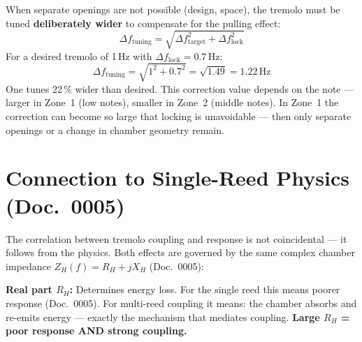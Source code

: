 \documentclass[11pt,a4paper]{article}
\begin{document}
When separate openings are not possible (design, space), the tremolo must be tuned \textbf{deliberately wider} to compensate for the pulling effect:
\begin{equation}
\Delta f_\text{tuning} = \sqrt{\Delta f_\text{target}^2 + \Delta f_\text{lock}^2}
\end{equation}
For a desired tremolo of 1\,Hz with $\Delta f_\text{lock} = 0{.}7$\,Hz:
\begin{equation}
\Delta f_\text{tuning} = \sqrt{1^2 + 0{.}7^2} = \sqrt{1{.}49} = 1{.}22\,\text{Hz}
\end{equation}
One tunes 22\,\% wider than desired. This correction value depends on the note --- larger in Zone~1 (low notes), smaller in Zone~2 (middle notes). In Zone~1 the correction can become so large that locking is unavoidable --- then only separate openings or a change in chamber geometry remain.

\begin{table}[H]
\centering\small
\caption{Tuning compensation table (shared opening, full volume)}
\end{table}

\section{Connection to Single-Reed Physics (Doc.~0005)}

The correlation between tremolo coupling and response is not coincidental --- it follows from the physics. Both effects are governed by the same complex chamber impedance $Z_H(f) = R_H + jX_H$ (Doc.~0005):

\textbf{Real part $R_H$:} Determines energy loss. For the single reed this means poorer response (Doc.~0005). For multi-reed coupling it means: the chamber absorbs and re-emits energy --- exactly the mechanism that mediates coupling. \textbf{Large $R_H$ = poor response AND strong coupling.}
\end{document}
